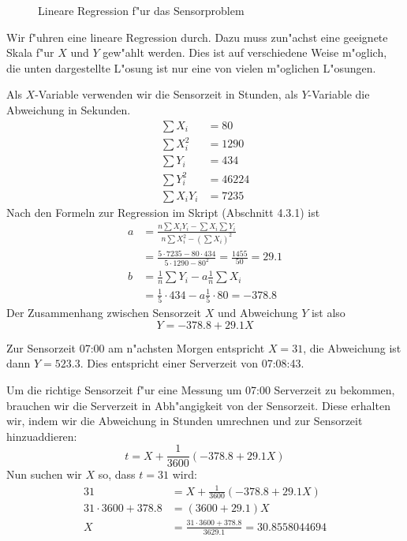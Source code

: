 \begin{figure}
\begin{center}
\end{center}
\caption{Lineare Regression f"ur das Sensorproblem}
\end{figure}
\begin{loesung}
Wir f"uhren eine lineare Regression durch. Dazu muss zun"achst eine
geeignete Skala f"ur $X$ und $Y$ gew"ahlt werden. Dies ist auf
verschiedene Weise m"oglich, die unten dargestellte L"osung ist nur
eine von vielen m"oglichen L"osungen.

Als $X$-Variable verwenden wir
die Sensorzeit in Stunden, als $Y$-Variable die Abweichung in Sekunden.
\begin{align*}
\sum X_i&=80
\\
\sum X_i^2&=1290
\\
\sum Y_i&=434
\\
\sum Y_i^2&=46224
\\
\sum X_iY_i&=7235
\end{align*}
Nach den Formeln zur Regression  im Skript (Abschnitt 4.3.1) ist
\begin{align*}
a&=\frac{n\sum X_iY_i-\sum X_i\sum Y_i}{n\sum X_i^2-(\sum X_i)^2}
\\
&=\frac{5\cdot 7235-80\cdot 434}{5\cdot 1290-80^2}=\frac{1455}{50}=29.1
\\
b&=\frac1n\sum Y_i -a\frac1n\sum X_i
\\
&=\frac15\cdot 434-a\frac15\cdot 80=-378.8
\end{align*}
Der Zusammenhang zwischen Sensorzeit $X$ und Abweichung $Y$ ist also
\[
Y=-378.8+29.1 X
\]
\begin{teilaufgaben}
\item Zur Sensorzeit 07:00 am n"achsten Morgen entspricht $X=31$, die
Abweichung ist dann
$Y=523.3$. Dies entspricht einer Serverzeit von 07:08:43.
\item
Um die richtige Sensorzeit f"ur eine Messung um 07:00 Serverzeit zu bekommen,
brauchen wir die Serverzeit in Abh"angigkeit von der Sensorzeit. Diese erhalten
wir, indem wir die Abweichung in Stunden umrechnen und zur Sensorzeit
hinzuaddieren:
\[
t=X+\frac1{3600}(-378.8+29.1X)
\]
Nun suchen wir $X$ so, dass $t=31$ wird:
\begin{align*}
31&=X+\frac1{3600}(-378.8+29.1X)
\\
31\cdot 3600 +378.8&=(3600 + 29.1)X
\\
X&=\frac{31\cdot 3600 + 378.8}{3629.1}=30.8558044694

\end{align*}
\end{teilaufgaben}
\end{loesung}
